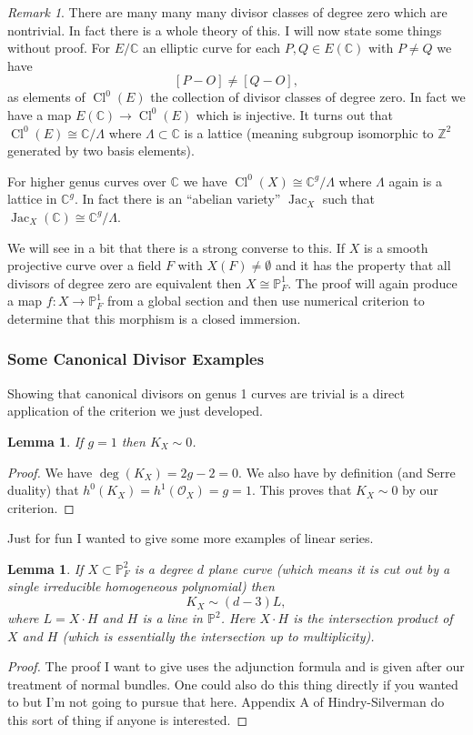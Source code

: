 \documentclass[12pt]{article}
\numberwithin{equation}{section}
\newtheorem{lemma}[theorem]{Lemma}
\theoremstyle{definition}
\theoremstyle{remark}
\newtheorem{remark}[theorem]{Remark}
\newcommand{\CC}{\mathbb{C}}
\newcommand{\ZZ}{\mathbb{Z}}
\newcommand{\Ocal}{\mathcal{O}}
\newcommand{\PP}{\mathbb{P}}
\newcommand{\Cl}{\operatorname{Cl}}
\newcommand{\Jac}{\operatorname{Jac}}
\begin{document}
	\begin{remark}
		There are many many many divisor classes of degree zero which are nontrivial. 
		In fact there is a whole theory of this. 
		I will now state some things without proof.
		For $E/\CC$ an elliptic curve for each $P,Q\in E(\CC)$ with $P\neq Q$ we have  
		 $$ [P-O] \neq [Q-O], $$
		as elements of $\Cl^0(E)$ the collection of divisor classes of degree zero. 
		In fact we have a map $E(\CC) \to \Cl^0(E)$ which is injective. 
		It turns out that $\Cl^0(E) \cong \CC/\Lambda$ where $\Lambda\subset \CC$ is a lattice (meaning subgroup isomorphic to $\ZZ^2$ generated by two basis elements). 
		
		For higher genus curves over $\CC$ we have $\Cl^0(X) \cong \CC^g/\Lambda$ where $\Lambda$ again is a lattice in $\CC^g$. 
		In fact there is an ``abelian variety'' $\Jac_X$ such that $\Jac_X(\CC)\cong \CC^g/\Lambda$.
	\end{remark}

We will see in a bit that there is a strong converse to this. 
If $X$ is a smooth projective curve over a field $F$ with $X(F)\neq \emptyset$ and it has the property that all divisors of degree zero are equivalent then $X\cong \PP^1_F$. 
The proof will again produce a map $f:X \to \PP^1_F$ from a global section and then use numerical criterion to determine that this morphism is a closed immersion.

\subsubsection{Some Canonical Divisor Examples}

Showing that canonical divisors on genus 1 curves are trivial is a direct application of the criterion we just developed. 
\begin{lemma}
	If $g=1$ then $K_X\sim 0$. 
\end{lemma}
\begin{proof}
	We have $\deg(K_X) =2g-2=0$. 
	We also have by definition (and Serre duality) that $h^0(K_X)=h^1(\Ocal_X)=g=1$.
	This proves that $K_X\sim 0$ by our criterion.
\end{proof}

Just for fun I wanted to give some more examples of linear series. 
\begin{lemma}
	If $X\subset \PP^2_F$ is a degree $d$ plane curve (which means it is cut out by a single irreducible homogeneous polynomial) then 
	$$K_X\sim (d-3) L, $$
	where $L = X\cdot H$ and $H$ is a line in $\PP^2$.
	Here $X\cdot H$ is the intersection product of $X$ and $H$ (which is essentially the intersection up to multiplicity). 
\end{lemma}
\begin{proof}
	The proof I want to give uses the adjunction formula and is given after our treatment of normal bundles.
	One could also do this thing directly if you wanted to but I'm not going to pursue that here.
	Appendix A of Hindry-Silverman do this sort of thing if anyone is interested.
\end{proof}
\end{document}
